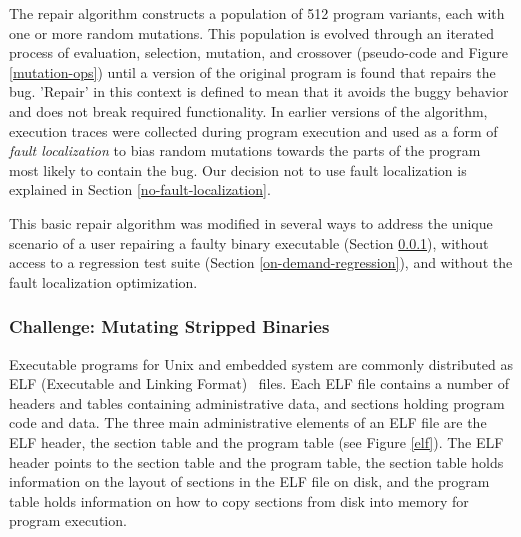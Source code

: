 \documentclass{sigcomm-alternate}
\begin{document}
The repair algorithm constructs a population of 512 program variants,
each with one or more random mutations.  This population is evolved
through an iterated process of evaluation, selection, mutation, and
crossover (pseudo-code and Figure \ref{mutation-ops}) until a version of
the original program is found that repairs the bug.  'Repair' in this
context is defined to mean that it avoids the buggy behavior and does
not break required functionality.  In earlier versions of the
algorithm, execution traces were collected during program execution
and used as a form of \emph{fault localization} to bias random
mutations towards the parts of the program most likely to contain the
bug.  Our decision not to use fault localization is explained in
Section \ref{no-fault-localization}.

This basic repair algorithm was modified in several ways to address
the unique scenario of a user repairing a faulty binary executable
(Section \ref{mutate-mips}), without access to a regression test suite
(Section \ref{on-demand-regression}), and without the fault
localization optimization.

\subsubsection{Challenge: Mutating Stripped Binaries}
\label{mutate-mips}

Executable programs for Unix and embedded system are commonly distributed
as ELF (Executable and Linking Format)~\cite{tis1995tool} files. 
Each ELF file contains a number of headers
and tables containing administrative data, and sections holding
program code and data.  The three main administrative elements of an
ELF file are the ELF header, the section table and the program table
(see Figure \ref{elf}).  The ELF header points to the section table and the
program table, the section table holds information on the layout of
sections in the ELF file on disk, and the program table holds
information on how to copy sections from disk into memory for program
execution.
\end{document}
